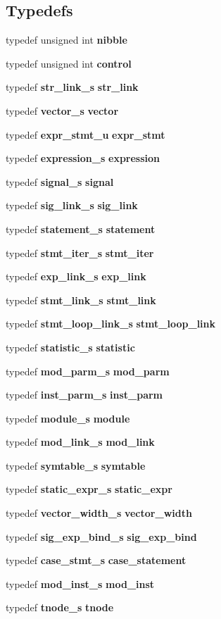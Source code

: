 \subsection*{Typedefs}
\begin{CompactItemize}
\item 
typedef unsigned int {\bf nibble}
\item 
typedef unsigned int {\bf control}
\item 
typedef {\bf str\_\-link\_\-s} {\bf str\_\-link}
\item 
typedef {\bf vector\_\-s} {\bf vector}
\item 
typedef {\bf expr\_\-stmt\_\-u} {\bf expr\_\-stmt}
\item 
typedef {\bf expression\_\-s} {\bf expression}
\item 
typedef {\bf signal\_\-s} {\bf signal}
\item 
typedef {\bf sig\_\-link\_\-s} {\bf sig\_\-link}
\item 
typedef {\bf statement\_\-s} {\bf statement}
\item 
typedef {\bf stmt\_\-iter\_\-s} {\bf stmt\_\-iter}
\item 
typedef {\bf exp\_\-link\_\-s} {\bf exp\_\-link}
\item 
typedef {\bf stmt\_\-link\_\-s} {\bf stmt\_\-link}
\item 
typedef {\bf stmt\_\-loop\_\-link\_\-s} {\bf stmt\_\-loop\_\-link}
\item 
typedef {\bf statistic\_\-s} {\bf statistic}
\item 
typedef {\bf mod\_\-parm\_\-s} {\bf mod\_\-parm}
\item 
typedef {\bf inst\_\-parm\_\-s} {\bf inst\_\-parm}
\item 
typedef {\bf module\_\-s} {\bf module}
\item 
typedef {\bf mod\_\-link\_\-s} {\bf mod\_\-link}
\item 
typedef {\bf symtable\_\-s} {\bf symtable}
\item 
typedef {\bf static\_\-expr\_\-s} {\bf static\_\-expr}
\item 
typedef {\bf vector\_\-width\_\-s} {\bf vector\_\-width}
\item 
typedef {\bf sig\_\-exp\_\-bind\_\-s} {\bf sig\_\-exp\_\-bind}
\item 
typedef {\bf case\_\-stmt\_\-s} {\bf case\_\-statement}
\item 
typedef {\bf mod\_\-inst\_\-s} {\bf mod\_\-inst}
\item 
typedef {\bf tnode\_\-s} {\bf tnode}
\end{CompactItemize}
